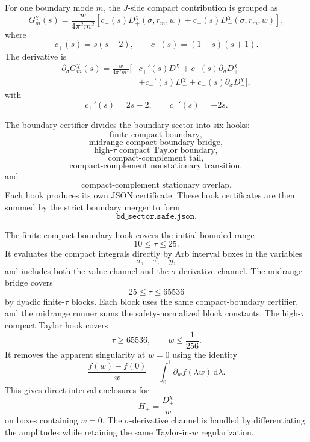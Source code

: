 \documentclass[11pt]{article}
\newcommand{\dd}{\mathrm{d}}
\newcommand{\s}{s}
\newcommand{\sig}{\sigma}
\newcommand{\tauh}{\tau}
\newcommand{\code}[1]{\texttt{#1}}
\begin{document}
For one boundary mode \(m\), the \(J\)-side compact contribution is grouped as
\[
        G_m^\chi(\s)
        =
        \frac{w}{4\pi^2m^2}
        \left[
            c_+(\s)D_+^\chi(\sig,r_m,w)
            +
            c_-(\s)D_-^\chi(\sig,r_m,w)
        \right],
\]
where
\[
        c_+(\s)=\s(\s-2),
        \qquad
        c_-(\s)=(1-\s)(\s+1).
\]
The derivative is
\[
\begin{aligned}
        \partial_\sig G_m^\chi(\s)
        =
        \frac{w}{4\pi^2m^2}
        \big[
            &c_+'(\s)D_+^\chi
            +
            c_+(\s)\partial_\sig D_+^\chi
            \\
            &+
            c_-'(\s)D_-^\chi
            +
            c_-(\s)\partial_\sig D_-^\chi
        \big],
\end{aligned}
\]
with
\[
        c_+'(\s)=2\s-2,
        \qquad
        c_-'(\s)=-2\s.
\]

The boundary certifier divides the boundary sector into six hooks:
\[
        \text{finite compact boundary},
\]
\[
        \text{midrange compact boundary bridge},
\]
\[
        \text{high-\(\tauh\) compact Taylor boundary},
\]
\[
        \text{compact-complement tail},
\]
\[
        \text{compact-complement nonstationary transition},
\]
and
\[
        \text{compact-complement stationary overlap}.
\]
Each hook produces its own JSON certificate.  These hook certificates are then
summed by the strict boundary merger to form
\[
        \code{bd\_sector.safe.json}.
\]

The finite compact-boundary hook covers the initial bounded range
\[
        10\le\tauh\le25.
\]
It evaluates the compact integrals directly by Arb interval boxes in the
variables
\[
        \sig,\quad \tauh,\quad y,
\]
and includes both the value channel and the \(\sig\)-derivative channel.  The
midrange bridge covers
\[
        25\le\tauh\le65536
\]
by dyadic finite-\(\tauh\) blocks.  Each block uses the same compact-boundary
certifier, and the midrange runner sums the safety-normalized block constants.
The high-\(\tauh\) compact Taylor hook covers
\[
        \tauh\ge65536,
        \qquad
        w\le\frac1{256}.
\]
It removes the apparent singularity at \(w=0\) using the identity
\[
        \frac{f(w)-f(0)}{w}
        =
        \int_0^1
        \partial_w f(\lambda w)
        \,\dd\lambda.
\]
This gives direct interval enclosures for
\[
        H_\pm=\frac{D_\pm^\chi}{w}
\]
on boxes containing \(w=0\).  The \(\sig\)-derivative channel is handled by
differentiating the amplitudes while retaining the same Taylor-in-\(w\)
regularization.
\end{document}
